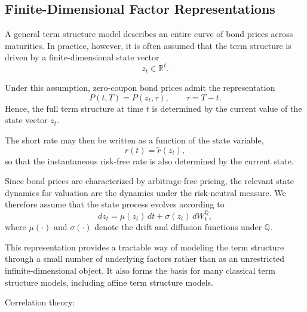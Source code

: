 
\subsection{Finite-Dimensional Factor Representations}

A general term structure model describes an entire curve of bond prices across maturities. In practice, however, it is often assumed that the term structure is driven by a finite-dimensional state vector
\[
z_t \in \mathbb{R}^{\ell}.
\]

Under this assumption, zero-coupon bond prices admit the representation
\begin{equation}
P(t,T)=P(z_t,\tau), \qquad \tau=T-t.
\label{eq:state_representation}
\end{equation}
Hence, the full term structure at time \(t\) is determined by the current value of the state vector \(z_t\).

The short rate may then be written as a function of the state variable,
\begin{equation}
r(t)=\tilde r(z_t),
\label{eq:short_rate_state}
\end{equation}
so that the instantaneous risk-free rate is also determined by the current state.

Since bond prices are characterized by arbitrage-free pricing, the relevant state dynamics for valuation are the dynamics under the risk-neutral measure. We therefore assume that the state process evolves according to
\begin{equation}
dz_t=\mu(z_t)\,dt+\sigma(z_t)\,dW_t^{\mathbb Q},
\label{eq:state_dynamics}
\end{equation}
where \(\mu(\cdot)\) and \(\sigma(\cdot)\) denote the drift and diffusion functions under \(\mathbb Q\).

This representation provides a tractable way of modeling the term structure through a small number of underlying factors rather than as an unrestricted infinite-dimensional object. It also forms the basis for many classical term structure models, including affine term structure models.




Correlation theory:





